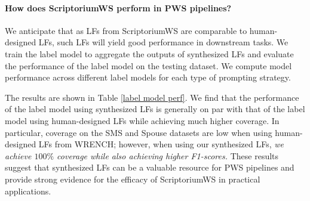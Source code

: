 \paragraph{How does ScriptoriumWS perform in PWS pipelines?}
We anticipate that as LFs from ScriptoriumWS are comparable to human-designed LFs, such LFs will yield good performance in downstream tasks.  
We train the label model to aggregate the outputs of synthesized LFs and evaluate the performance of the label model on the testing dataset.
We compute model performance across different label models for each type of prompting strategy.

The results are shown in Table \ref{label model perf}. We find that the performance of the label model using synthesized LFs is generally on par with that of the label model using human-designed LFs while achieving much higher coverage. 
In particular, coverage on the SMS and Spouse datasets are low when using human-designed LFs from WRENCH; however, when using our synthesized LFs, \textit{we achieve $100\%$ coverage while also achieving higher F1-scores.} 
These results suggest that synthesized LFs can be a valuable resource for PWS pipelines and provide strong evidence for the efficacy of ScriptoriumWS in practical applications. 


